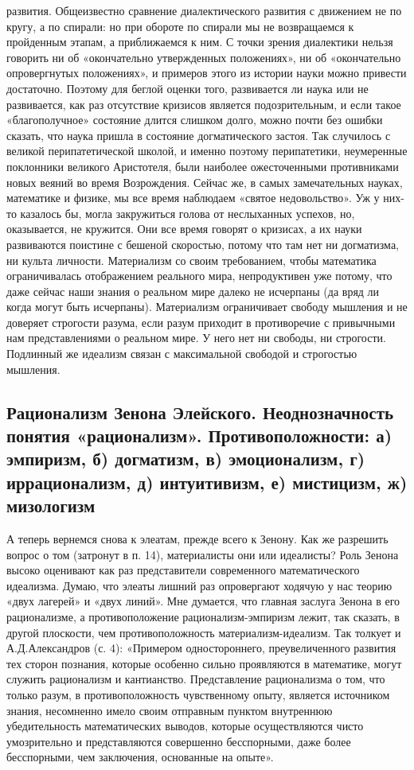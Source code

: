 развития. Общеизвестно сравнение диалектического развития с движением
не по кругу, а по спирали: но при обороте по спирали мы не
возвращаемся к пройденным этапам, а приближаемся к ним. С точки зрения
диалектики нельзя говорить ни об «окончательно утвержденных
положениях», ни об «окончательно опровергнутых положениях», и примеров
этого из истории науки можно привести достаточно. Поэтому для беглой
оценки того, развивается ли наука или не развивается, как раз
отсутствие кризисов является подозрительным, и если такое
«благополучное» состояние длится слишком долго, можно почти без ошибки
сказать, что наука пришла в состояние догматического застоя. Так
случилось с великой перипатетической школой, и именно поэтому
перипатетики, неумеренные поклонники великого Аристотеля, были
наиболее ожесточенными противниками новых веяний во время Возрождения.
Сейчас же, в самых замечательных науках, математике и физике, мы все
время наблюдаем «святое недовольство». Уж у них-то казалось бы, могла
закружиться голова от неслыханных успехов, но, оказывается, не
кружится. Они все время говорят о кризисах, а их науки развиваются
поистине с бешеной скоростью, потому что там нет ни догматизма, ни
культа личности. Материализм со своим требованием, чтобы математика
ограничивалась отображением реального мира, непродуктивен уже потому,
что даже сейчас наши знания о реальном мире далеко не исчерпаны (да
вряд ли когда могут быть исчерпаны). Материализм ограничивает свободу
мышления и не доверяет строгости разума, если разум приходит в
противоречие с привычными нам представлениями о реальном мире. У него
нет ни свободы, ни строгости. Подлинный же идеализм связан с
максимальной свободой и строгостью мышления.

\subsection{Рационализм Зенона Элейского. Неоднозначность понятия
«рационализм». Противоположности: а) эмпиризм, б) догматизм,
в) эмоционализм, г) иррационализм, д) интуитивизм, е) мистицизм, ж)
мизологизм}

А теперь вернемся снова к элеатам, прежде всего к Зенону. Как же
разрешить вопрос о том (затронут в п. 14), материалисты они или
идеалисты? Роль Зенона высоко оценивают как раз представители
современного математического идеализма. Думаю, что элеаты лишний раз
опровергают ходячую у нас теорию «двух лагерей» и «двух линий». Мне
думается, что главная заслуга Зенона в его рационализме, а
противоположение рационализм-эмпиризм лежит, так сказать, в другой
плоскости, чем противоположность материализм-идеализм. Так толкует и
А.Д.Александров (с. 4): «Примером одностороннего, преувеличенного
развития тех сторон познания, которые особенно сильно проявляются в
математике, могут служить рационализм и кантианство. Представление
рационализма о том, что только разум, в противоположность чувственному
опыту, является источником знания, несомненно имело своим отправным
пунктом внутреннюю убедительность математических выводов, которые
осуществляются чисто умозрительно и представляются совершенно
бесспорными, даже более бесспорными, чем заключения, основанные на
опыте».

